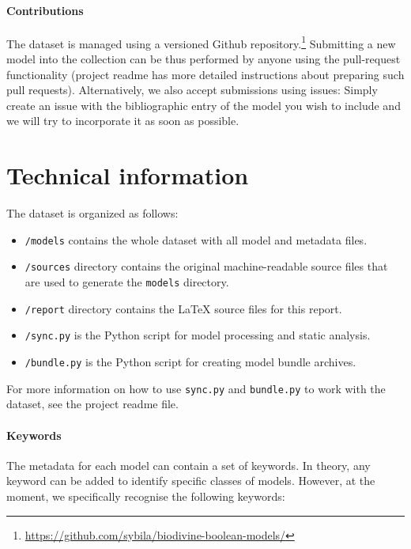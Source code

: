 \documentclass{article}
\begin{document}
\paragraph{Contributions}

The dataset is managed using a versioned Github repository.\footnote{\url{https://github.com/sybila/biodivine-boolean-models/}} Submitting a new model into the collection can be thus performed by anyone using the pull-request functionality (project readme has more detailed instructions about preparing such pull requests). Alternatively, we also accept submissions using issues: Simply create an issue with the bibliographic entry of the model you wish to include and we will try to incorporate it as soon as possible.

\section{Technical information}
\label{section:technical}

The dataset is organized as follows:

\begin{itemize}
	\item \texttt{/models} contains the whole dataset with all model and metadata files.
	\item \texttt{/sources} directory contains the original machine-readable source files that are used to generate the \texttt{models} directory.
	\item \texttt{/report} directory contains the LaTeX source files for this report.
	\item \texttt{/sync.py} is the Python script for model processing and static analysis.
	\item \texttt{/bundle.py} is the Python script for creating model bundle archives.
\end{itemize}

For more information on how to use \texttt{sync.py} and \texttt{bundle.py} to work with the dataset, see the project readme file.

\paragraph{Keywords} The metadata for each model can contain a set of keywords. In theory, any keyword can be added to identify specific classes of models. However, at the moment, we specifically recognise the following keywords:
\end{document}
